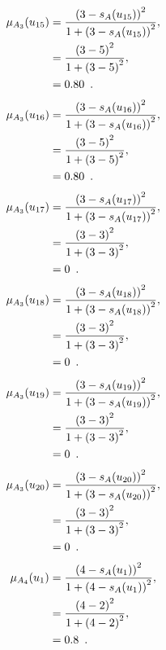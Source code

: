 \documentclass[a4paper,openany]{book}
\begin{document}
				\begin{align}
					\mu_{A_3}(u_{15}) &= \frac{\left(3-s_A(u_{15})\right)^2}{1 + \left(3-s_A(u_{15})\right)^2} ,\\
					&= \frac{\left(3-5\right)^2}{1 + \left(3-5\right)^2} \notag ,\\
					&= 0.80 \enspace. \notag
				\end{align}
				\begin{align}
					\mu_{A_3}(u_{16}) &= \frac{\left(3-s_A(u_{16})\right)^2}{1 + \left(3-s_A(u_{16})\right)^2} ,\\
					&= \frac{\left(3-5\right)^2}{1 + \left(3-5\right)^2} \notag ,\\
					&= 0.80 \enspace. \notag
				\end{align}
				\begin{align}
					\mu_{A_3}(u_{17}) &= \frac{\left(3-s_A(u_{17})\right)^2}{1 + \left(3-s_A(u_{17})\right)^2} ,\\
					&= \frac{\left(3-3\right)^2}{1 + \left(3-3\right)^2} \notag ,\\
					&= 0 \enspace. \notag
				\end{align}
				\begin{align}
					\mu_{A_3}(u_{18}) &= \frac{\left(3-s_A(u_{18})\right)^2}{1 + \left(3-s_A(u_{18})\right)^2} ,\\
					&= \frac{\left(3-3\right)^2}{1 + \left(3-3\right)^2} \notag ,\\
					&= 0 \enspace. \notag
				\end{align}
				\begin{align}
					\mu_{A_3}(u_{19}) &= \frac{\left(3-s_A(u_{19})\right)^2}{1 + \left(3-s_A(u_{19})\right)^2} ,\\
					&= \frac{\left(3-3\right)^2}{1 + \left(3-3\right)^2} \notag ,\\
					&= 0 \enspace. \notag
				\end{align}
				\begin{align}
					\mu_{A_3}(u_{20}) &= \frac{\left(3-s_A(u_{20})\right)^2}{1 + \left(3-s_A(u_{20})\right)^2} ,\\
					&= \frac{\left(3-3\right)^2}{1 + \left(3-3\right)^2} \notag ,\\
					&= 0 \enspace. \notag
				\end{align}
				\begin{align}
					\mu_{A_4}(u_1) &= \frac{\left(4-s_A(u_1)\right)^2}{1 + \left(4-s_A(u_1)\right)^2} ,\\
					&= \frac{\left(4-2\right)^2}{1 + \left(4-2\right)^2} \notag ,\\
					&= 0.8 \enspace. \notag
				\end{align}
\end{document}
